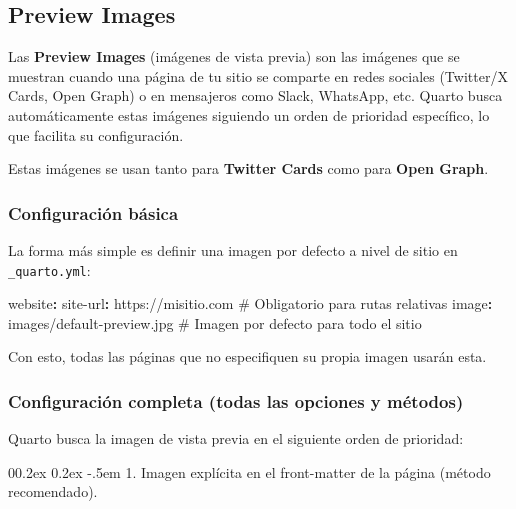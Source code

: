 \documentclass[
  doc,
  floatsintext,
  longtable,
  a4paper,
  nolmodern,
  notxfonts,
  notimes,
  12pt,
  colorlinks=true,linkcolor=blue,citecolor=blue,urlcolor=blue]{apa7}
\makeatletter
\renewcommand{\paragraph}{\@startsection{paragraph}{4}{\parindent}%
	{0\baselineskip \@plus 0.2ex \@minus 0.2ex}%
	{-.5em}%
	{\normalfont\normalsize\bfseries\typesectitle}}
\newenvironment{Shaded}{\begin{snugshade}}{\end{snugshade}}
\newcommand{\AttributeTok}[1]{\textcolor[rgb]{0.40,0.45,0.13}{#1}}
\newcommand{\CommentTok}[1]{\textcolor[rgb]{0.37,0.37,0.37}{#1}}
\newcommand{\FunctionTok}[1]{\textcolor[rgb]{0.28,0.35,0.67}{#1}}
\newcommand{\KeywordTok}[1]{\textcolor[rgb]{0.00,0.23,0.31}{\textbf{#1}}}
\makeatother
\begin{document}
\subsection{Preview Images}\label{preview-images}

Las \textbf{Preview Images} (imágenes de vista previa) son las imágenes
que se muestran cuando una página de tu sitio se comparte en redes
sociales (Twitter/X Cards, Open Graph) o en mensajeros como Slack,
WhatsApp, etc. Quarto busca automáticamente estas imágenes siguiendo un
orden de prioridad específico, lo que facilita su configuración.

Estas imágenes se usan tanto para \textbf{Twitter Cards} como para
\textbf{Open Graph}.

\subsubsection{Configuración básica}\label{configuraciuxf3n-buxe1sica}

La forma más simple es definir una imagen por defecto a nivel de sitio
en \texttt{\_quarto.yml}:

\begin{Shaded}
\begin{Highlighting}[]
\FunctionTok{website}\KeywordTok{:}
\AttributeTok{  }\FunctionTok{site{-}url}\KeywordTok{:}\AttributeTok{ https://misitio.com}\CommentTok{      \# Obligatorio para rutas relativas}
\AttributeTok{  }\FunctionTok{image}\KeywordTok{:}\AttributeTok{ images/default{-}preview.jpg}\CommentTok{  \# Imagen por defecto para todo el sitio}
\end{Highlighting}
\end{Shaded}

Con esto, todas las páginas que no especifiquen su propia imagen usarán
esta.

\subsubsection{Configuración completa (todas las opciones y
métodos)}\label{configuraciuxf3n-completa-todas-las-opciones-y-muxe9todos}

Quarto busca la imagen de vista previa en el siguiente orden de
prioridad:

\paragraph{1. Imagen explícita en el front-matter de la página (método
recomendado).}\label{imagen-expluxedcita-en-el-front-matter-de-la-puxe1gina-muxe9todo-recomendado}
\end{document}
